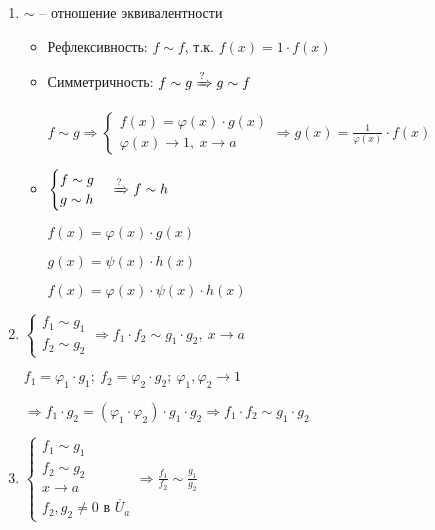 \documentclass[14pt, letter paper]{article}
\begin{document}
\begin{enumerate}
    \item $\sim$ -- отношение эквивалентности

    \begin{itemize}
        \item Рефлексивность: $f \sim f$, т.к. $f(x) = 1 \cdot f(x)$

        \item Симметричность: $f \sim g \xRightarrow[]{?} g \sim f$

        $f \sim g \Rightarrow \begin{cases}
            f(x) = \varphi(x) \cdot g(x) \\
            \varphi(x) \rightarrow 1,\ x \rightarrow a
        \end{cases} \Rightarrow g(x) = \frac{1}{\varphi(x)} \cdot f(x)$

        \item $\begin{cases}
            f \sim g \\
            g \sim h \\
        \end{cases} \xRightarrow[]{?} f \sim h$

        $f(x) = \varphi(x) \cdot g(x)$

        $g(x) = \psi(x) \cdot h(x)$

        $f(x) = \varphi(x) \cdot \psi(x) \cdot h(x)$
    \end{itemize}

    \item $\begin{cases}
        f_1 \sim g_1 \\
        f_2 \sim g_2 
    \end{cases} \Rightarrow f_1 \cdot f_2 \sim g_1 \cdot g_2,\ x \rightarrow a$

    $f_1 = \varphi_1 \cdot g_1;\ f_2 = \varphi_2 \cdot g_2;\ \varphi_1, \varphi_2 \rightarrow 1$

    $\Rightarrow f_1 \cdot g_2 = (\varphi_1 \cdot \varphi_2) \cdot g_1 \cdot g_2 \Rightarrow f_1 \cdot f_2 \sim g_1 \cdot g_2$

    \item $\begin{cases}
        f_1 \sim g_1 \\
        f_2 \sim g_2 \\
        x \rightarrow a \\
        f_2, g_2 \neq 0 \text{ в } \mathring{U_a}
    \end{cases} \Rightarrow \frac{f_1}{f_2} \sim \frac{g_1}{g_2}$


\end{enumerate}
\end{document}
